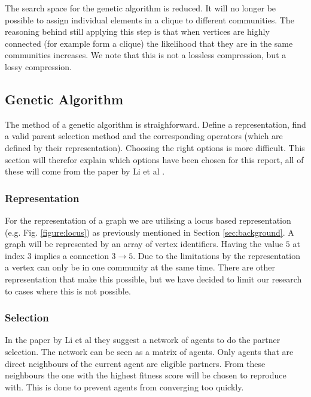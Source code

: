 The search space for the genetic algorithm is reduced. 
It will no longer be possible to assign individual elements in a clique to different communities.
The reasoning behind still applying this step is that when vertices are highly connected (for example form a clique) the likelihood that they are in the same communities increases. 
We note that this is not a lossless compression, but a lossy compression.

\subsection{Genetic Algorithm}
The method of a genetic algorithm is straighforward.
Define a representation, find a valid parent selection method and the corresponding operators (which are defined by their representation).
Choosing the right options is more difficult.
This section will therefor explain which options have been chosen for this report, all of these will come from the paper by Li et al \cite{Li2016}.

\subsubsection{Representation}
For the representation of a graph we are utilising a locus based representation (e.g. Fig. \ref{figure:locus}) as previously mentioned in Section \ref{sec:background}.
A graph will be represented by an array of vertex identifiers.
Having the value $5$ at index $3$ implies a connection $3 \rightarrow 5$.
Due to the limitations by the representation a vertex can only be in one community at the same time.
There are other representation that make this possible, but we have decided to limit our research to cases where this is not possible.

\subsubsection{Selection}
In the paper by Li et al \cite{Li2016} they suggest a network of agents to do the partner selection.
The network can be seen as a matrix of agents.
Only agents that are direct neighbours of the current agent are eligible partners.
From these neighbours the one with the highest fitness score will be chosen to reproduce with.
This is done to prevent agents from converging too quickly.

